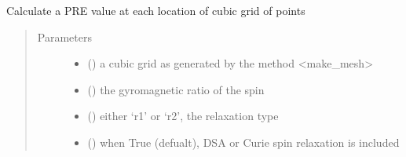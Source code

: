 \documentclass[a4paper,10pt,english,openany,oneside]{sphinxmanual}
\begin{document}
\begin{fulllineitems}
\begin{fulllineitems}
\begin{fulllineitems}
\label{\detokenize{reference/generated/paramagpy.metal.Metal.pre_mesh:paramagpy.metal.Metal.pre_mesh}}
\sphinxAtStartPar
Calculate a PRE value at each location of cubic grid of points
\begin{quote}\begin{description}
\item[{Parameters}] \leavevmode\begin{itemize}
\item {} 
\sphinxAtStartPar
{} (\sphinxstyleliteralemphasis{\sphinxupquote{ (}}\sphinxstyleliteralemphasis{\sphinxupquote{,}}\sphinxstyleliteralemphasis{\sphinxupquote{,}}\sphinxstyleliteralemphasis{\sphinxupquote{,}}\sphinxstyleliteralemphasis{\sphinxupquote{)}}) \textendash{} a cubic grid as generated by the method \textless{}make\_mesh\textgreater{}

\item {} 
\sphinxAtStartPar
{} () \textendash{} the gyromagnetic ratio of the spin

\item {} 
\sphinxAtStartPar
{} () \textendash{} either ‘r1’ or ‘r2’, the relaxation type

\item {} 
\sphinxAtStartPar
{} (\sphinxstyleliteralemphasis{\sphinxupquote{ (}}\sphinxstyleliteralemphasis{\sphinxupquote{)}}) \textendash{} when True (defualt), DSA or Curie spin relaxation is included


\end{itemize}
\end{description}
\end{quote}
\end{fulllineitems}
\end{fulllineitems}
\end{fulllineitems}
\end{document}
